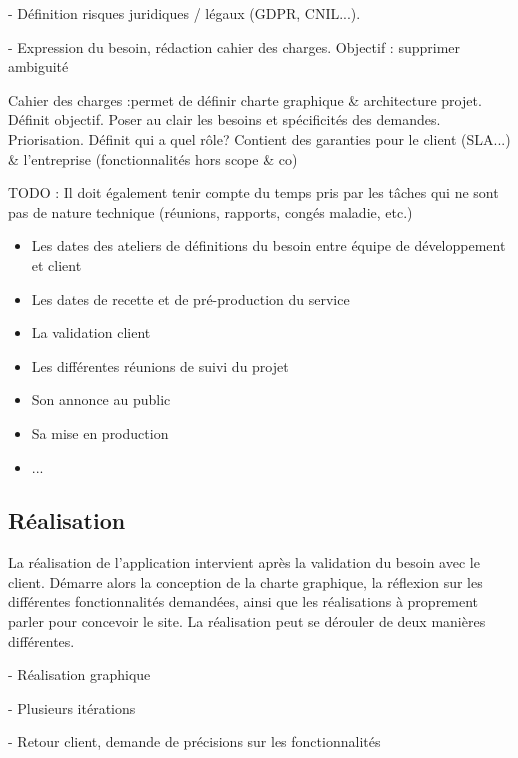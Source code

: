 

- Définition risques juridiques / légaux (GDPR, CNIL...).

- Expression du besoin, rédaction cahier des charges. Objectif : supprimer ambiguité

Cahier des charges :permet de définir charte graphique \& architecture projet. Définit objectif. Poser au clair les besoins et spécificités des demandes. Priorisation. Définit qui a quel rôle? Contient des garanties pour le client (SLA...) \& l'entreprise (fonctionnalités hors scope \& co)

TODO : Il doit également tenir compte du temps pris par les tâches qui ne sont pas de nature technique (réunions, rapports, congés maladie, etc.) 

\begin{itemize}
	\setlength\itemsep{-0.5em}
	\item Les dates des ateliers de définitions du besoin entre équipe de développement et client
	\item Les dates de recette et de pré-production du service
	\item La validation client
	\item Les différentes réunions de suivi du projet
	\item Son annonce au public
	\item Sa mise en production
	\item ...
\end{itemize}



\subsection{Réalisation}

La réalisation de l'application intervient après la validation du besoin avec le client. Démarre alors la conception de la charte graphique, la réflexion sur les différentes fonctionnalités demandées, ainsi que les réalisations à proprement parler pour concevoir le site. La réalisation peut se dérouler de deux manières différentes.

- Réalisation graphique

- Plusieurs itérations

- Retour client, demande de précisions sur les fonctionnalités

